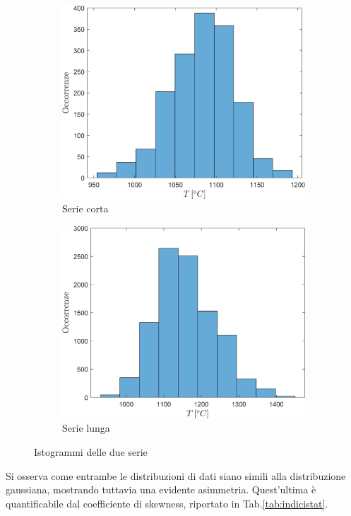 \begin{figure} [H]
	\centering
	\begin{subfigure}{0.49\textwidth}
		\centering
		\includegraphics[width=0.99\linewidth]{"../sperimentazione nei propulsori/istogrammashort"}
		\caption{Serie corta}
		\label{fig:istogrammashort}
	\end{subfigure}%
	\begin{subfigure}{0.49\textwidth}
		\centering
		\includegraphics[width=0.99\linewidth]{"../sperimentazione nei propulsori/istogrammalong"}
		\caption{Serie lunga}
		\label{fig:istogrammalong}
	\end{subfigure}
\caption{Istogrammi delle due serie}	
\label{fig:istboth}
\end{figure}
Si osserva come entrambe le distribuzioni di dati siano simili alla distribuzione gaussiana, mostrando tuttavia una evidente asimmetria. Quest'ultima è quantificabile dal coefficiente di skewness, riportato in Tab.\ref{tab:indicistat}.


